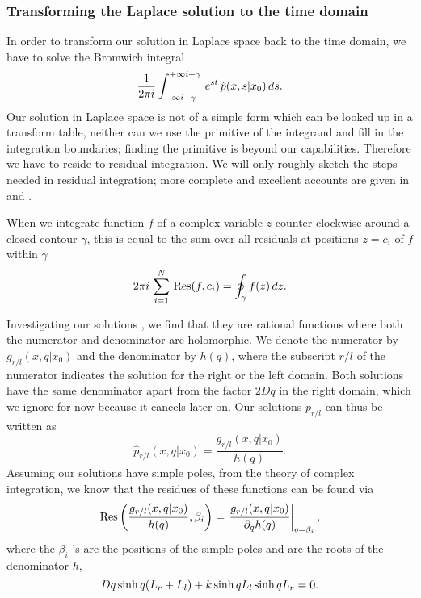 \subsubsection{Transforming the Laplace solution to the time domain}

In order to transform our solution in Laplace space back to the time domain, we have to solve the Bromwich integral
\begin{equation}
 \frac{1}{2 \pi i} \int_{-\infty i + \gamma}^{+\infty i + \gamma} \, e^{s t} \, \hat{p}(x,s|x_0) \, ds.
 \elabel{INT_I}
\end{equation}
Our solution in Laplace space is not of a simple form which can be looked up in a transform table, neither can we use the primitive of the integrand and fill in the integration boundaries; finding the primitive is beyond our capabilities. Therefore we have to reside to residual integration. We will only roughly sketch the steps needed in residual integration; more complete and excellent accounts are given in \cite{Carslaw1959} and \cite{Bossen2011a}.

When we integrate function $f$ of a complex variable $z$ counter-clockwise around a closed contour $\gamma$, this is equal to the sum over all residuals at positions $z = c_i$ of $f$ within $\gamma$
\begin{equation}
 2 \pi i\,\sum_{i=1}^{N}\,\mathrm{Res}(f,c_i) = \oint_\gamma f(z)\,dz.
 \elabel{RES_I}
\end{equation}

Investigating our solutions , we find that they are rational functions where both the numerator and denominator are holomorphic. We denote the numerator by $g_{r/l}(x,q|x_0)$ and the denominator by $h(q)$, where the subscript $r/l$ of the numerator indicates the solution for the right or the left domain. Both solutions have the same denominator apart from the factor $2 D q$ in the right domain, which we ignore for now because it cancels later on. Our solutions $p_{r/l}$ can thus be written as
\begin{equation} 
 \hat{p}_{r/l}(x,q|x_0) = \frac{g_{r/l}(x,q|x_0)}{h(q)}.
\end{equation}
Assuming our solutions have simple poles, from the theory of complex integration, we know that the residues of these functions can be found via
\begin{equation} 
 \mathrm{Res} \left( \frac{g_{r/l}(x,q|x_0)}{h(q)},\beta_i \right) = \left. \frac{g_{r/l}(x,q|x_0)}{\partial_q h(q)} \right|_{q = \beta_i},
 \elabel{RES_II}
\end{equation}
where the $\beta_i$ 's are the positions of the simple poles and are the roots of the denominator $h$,
\begin{equation} 
 Dq \, \mathrm{sinh} \, q (L_r + L_l) + k \, \mathrm{sinh} \, q L_l \, \mathrm{sinh} \, q L_r = 0.
 \elabel{ROOT_I}
\end{equation}

